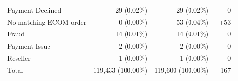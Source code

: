 \begin{longtable}{@{}lrrr@{}}
{Payment Declined} & 29 (0.02\%) & 29 (0.02\%) & 0 \\

{No matching ECOM order} & 0 (0.00\%) & 53 (0.04\%) & +53 \\

{Fraud} & 14 (0.01\%) & 14 (0.01\%) & 0 \\

{Payment Issue} & 2 (0.00\%) & 2 (0.00\%) & 0 \\

{Reseller} & 1 (0.00\%) & 1 (0.00\%) & 0 \\
\midrule
{Total} & 119,433 (100.00\%) & 119,600 (100.00\%) & +167 \\
\bottomrule
\end{longtable}
